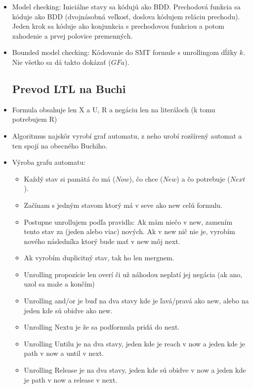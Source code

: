 \documentclass[paper=a4, fontsize=11pt]{scrartcl} %
\numberwithin{equation}{section} %
\numberwithin{figure}{section} %
\numberwithin{table}{section} %
\begin{document}
\begin{itemize}
	\item Model checking: Iniciálne stavy sa kódujú ako BDD. Prechodová funkcia sa kóduje ako BDD (dvojnásobná veľkosť, doslova kódujem reláciu prechodu). Jeden krok sa kóduje ako konjunkcia s prechodovou funkciou a potom zahodenie a prvej polovice premenných.
	
	\item Bounded model checking: Kódovanie do SMT formule s unrollingom dĺžky $k$. Nie všetko sa dá takto dokázať ($GF a$).
	
	\subsection{Prevod LTL na Buchi}
	
	\item Formula obsahuje len X a U, R a negáciu len na literáloch (k tomu potrebujem R)
	
	\item Algoritmus najskôr vyrobí graf automatu, z neho urobí rozšírený automat a ten spojí na obecného Buchiho.
	
	\item Výroba grafu automatu:
	
	\begin{itemize}
		\item Každý stav si pamätá čo má ($Now$), čo chce ($New$) a čo potrebuje ($Next$).
		\item Začínam s jedným stavom ktorý má v seve ako new celú formulu.
		\item Postupne unrollujem podľa pravidla: Ak mám niečo v new, zamením tento stav za (jeden alebo viac) nových. Ak v new nič nie je, vyrobím nového následníka ktorý bude mať v new môj next.
		\item Ak vyrobím duplicitný stav, tak ho len mergnem.
		\item Unrolling propozície len overí či už náhodou neplatí jej negácia (ak ano, uzol sa maže a končím)
		\item Unrolling and/or je buď na dva stavy kde je ľavá/pravá ako new, alebo na jeden kde sú obidve ako new.
		\item Unrolling Nextu je že sa podformula pridá do next.
		\item Unrolling Untilu je na dva stavy, jeden kde je reach v now a jeden kde je path v now a until v next.
		\item Unrolling Release je na dva stavy, jeden kde sú obidve v now a jeden kde je path v now a release v next.
	\end{itemize}


\end{itemize}
\end{document}
